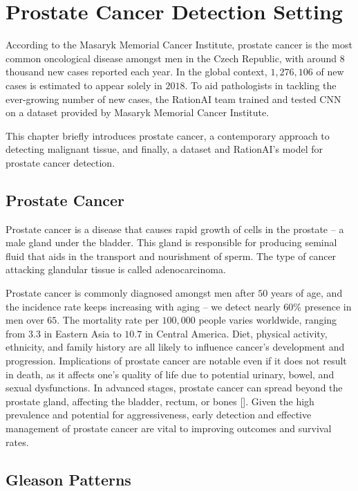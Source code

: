 \chapter{Prostate Cancer Detection Setting}

According to the Masaryk Memorial Cancer Institute, prostate cancer is the most common oncological disease amongst men in the Czech Republic, with around $8$ thousand new cases reported each year.
In the global context, $1,276,106$ of new cases is estimated to appear solely in $2018$.
To aid pathologists in tackling the ever-growing number of new cases, the RationAI team trained and tested CNN on a dataset provided by Masaryk Memorial Cancer Institute.

This chapter briefly introduces prostate cancer, a contemporary approach to detecting malignant tissue, and finally, a dataset and RationAI's model for prostate cancer detection.

\section{Prostate Cancer}

Prostate cancer is a disease that causes rapid growth of cells in the prostate -- a male gland under the bladder.
This gland is responsible for producing seminal fluid that aids in the transport and nourishment of sperm.
The type of cancer attacking glandular tissue is called adenocarcinoma.

Prostate cancer is commonly diagnosed amongst men after $50$ years of age, and the incidence rate keeps increasing with aging -- we detect nearly $60$\% presence in men over $65$.
The mortality rate per $100,000$ people varies worldwide, ranging from $3.3$ in Eastern Asia to $10.7$ in Central America. Diet, physical activity, ethnicity, and family history are all likely to influence cancer's development and progression.
Implications of prostate cancer are notable even if it does not result in death, as it affects one's quality of life due to potential urinary, bowel, and sexual dysfunctions.
In advanced stages, prostate cancer can spread beyond the prostate gland, affecting the bladder, rectum, or bones []. %
Given the high prevalence and potential for aggressiveness, early detection and effective management of prostate cancer are vital to improving outcomes and survival rates.

\section{Gleason Patterns}

